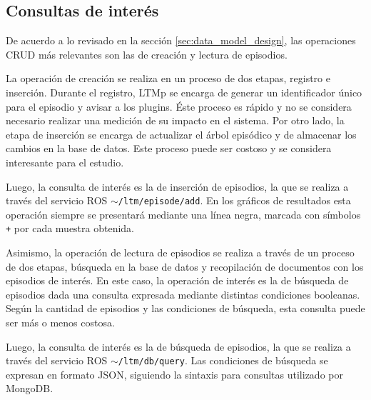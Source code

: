 \subsection{Consultas de interés}

De acuerdo a lo revisado en la sección \ref{sec:data_model_design}, las operaciones CRUD más relevantes son las de creación y lectura de episodios.

La operación de creación se realiza en un proceso de dos etapas, registro e inserción. Durante el registro, LTMp se encarga de generar un identificador único para el episodio y avisar a los plugins. Éste proceso es rápido y no se considera necesario realizar una medición de su impacto en el sistema. Por otro lado, la etapa de inserción se encarga de actualizar el árbol episódico y de almacenar los cambios en la base de datos. Este proceso puede ser costoso y se considera interesante para el estudio.

Luego, la consulta de interés es la de inserción de episodios, la que se realiza a través del servicio ROS \texttt{$\sim$/ltm/episode/add}. En los gráficos de resultados esta operación siempre se presentará mediante una línea negra, marcada con símbolos \texttt{+} por cada muestra obtenida.

Asimismo, la operación de lectura de episodios se realiza a través de un proceso de dos etapas, búsqueda en la base de datos y recopilación de documentos con los episodios de interés. En este caso, la operación de interés es la de búsqueda de episodios dada una consulta expresada mediante distintas condiciones booleanas. Según la cantidad de episodios y las condiciones de búsqueda, esta consulta puede ser más o menos costosa.

Luego, la consulta de interés es la de búsqueda de episodios, la que se realiza a través del servicio ROS \texttt{$\sim$/ltm/db/query}. Las condiciones de búsqueda se expresan en formato JSON, siguiendo la sintaxis para consultas utilizado por MongoDB.

